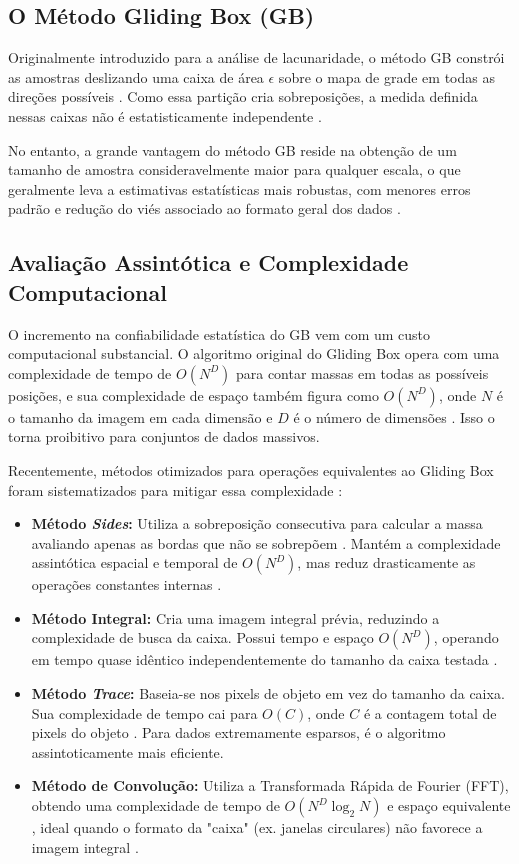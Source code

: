 \documentclass[12pt]{article}
\begin{document}
\subsection{O Método Gliding Box (GB)}

Originalmente introduzido para a análise de lacunaridade, o método GB constrói as amostras deslizando uma caixa de área $\epsilon$ sobre o mapa de grade em todas as direções possíveis \cite{saa2007}. Como essa partição cria sobreposições, a medida definida nessas caixas não é estatisticamente independente \cite{saa2007}. 

No entanto, a grande vantagem do método GB reside na obtenção de um tamanho de amostra consideravelmente maior para qualquer escala, o que geralmente leva a estimativas estatísticas mais robustas, com menores erros padrão e redução do viés associado ao formato geral dos dados \cite{saa2007}.

\subsection{Avaliação Assintótica e Complexidade Computacional}

O incremento na confiabilidade estatística do GB vem com um custo computacional substancial. O algoritmo original do Gliding Box opera com uma complexidade de tempo de $O(N^D)$ para contar massas em todas as possíveis posições, e sua complexidade de espaço também figura como $O(N^D)$, onde $N$ é o tamanho da imagem em cada dimensão e $D$ é o número de dimensões \cite{barna2024}. Isso o torna proibitivo para conjuntos de dados massivos.

Recentemente, métodos otimizados para operações equivalentes ao Gliding Box foram sistematizados para mitigar essa complexidade \cite{barna2024}:
\begin{itemize}
    \item \textbf{Método \textit{Sides}:} Utiliza a sobreposição consecutiva para calcular a massa avaliando apenas as bordas que não se sobrepõem \cite{barna2024}. Mantém a complexidade assintótica espacial e temporal de $O(N^D)$, mas reduz drasticamente as operações constantes internas \cite{barna2024}.
    \item \textbf{Método Integral:} Cria uma imagem integral prévia, reduzindo a complexidade de busca da caixa. Possui tempo e espaço $O(N^D)$, operando em tempo quase idêntico independentemente do tamanho da caixa testada \cite{barna2024}.
    \item \textbf{Método \textit{Trace}:} Baseia-se nos pixels de objeto em vez do tamanho da caixa. Sua complexidade de tempo cai para $O(C)$, onde $C$ é a contagem total de pixels do objeto \cite{barna2024}. Para dados extremamente esparsos, é o algoritmo assintoticamente mais eficiente.
    \item \textbf{Método de Convolução:} Utiliza a Transformada Rápida de Fourier (FFT), obtendo uma complexidade de tempo de $O(N^D \log_2 N)$ e espaço equivalente \cite{barna2024}, ideal quando o formato da "caixa" (ex. janelas circulares) não favorece a imagem integral \cite{barna2024}.
\end{itemize}
\end{document}
